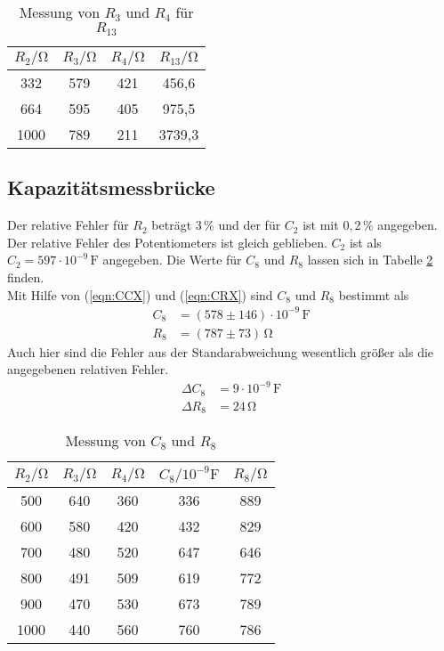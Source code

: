\begin{table}
  \centering
  \caption{Messung von $R_3$ und $R_4$ für $R_{13}$}
  \label{tab:R13}
  \begin{tabular}{c c c c}
    \toprule
    $R_2/\unit{\ohm}$ & $R_3/\unit{\ohm}$ & $R_4/\unit{\ohm}$ & $R_{13}/\unit{\ohm}$ \\
    \midrule
     332 & 579 & 421 &  456,6 \\
     664 & 595 & 405 &  975,5 \\
    1000 & 789 & 211 & 3739,3 \\
    \bottomrule
  \end{tabular}
\end{table}

\subsection{Kapazitätsmessbrücke}
Der relative Fehler für $R_2$ beträgt $3\,\%$ und der für $C_2$ ist mit $0,2 \,\%$ angegeben. Der relative Fehler des Potentiometers ist gleich geblieben.
$C_2$ ist als $C_2 = 597 \cdot 10^{-9}\,\unit{\farad}$ angegeben. Die Werte für $C_8$ und $R_8$ lassen sich in Tabelle \ref{tab:C8,R8} finden.\\
Mit Hilfe von (\ref{eqn:CCX}) und (\ref{eqn:CRX}) sind $C_8$ und $R_8$ bestimmt als
\begin{align*}
  C_8 &= (578 \pm 146)\cdot 10^{-9} \,\unit{\farad} \\
  R_8 &= (787 \pm 73)\,\unit{\ohm}
\end{align*}
Auch hier sind die Fehler aus der Standarabweichung wesentlich größer als die angegebenen relativen Fehler.
\begin{align*}
  \Delta C_{8} &= 9\cdot 10^{-9}\,\unit{\farad} \\
  \Delta R_{8} &= 24\,\unit{\ohm}
\end{align*}


\begin{table}
  \centering
  \caption{Messung von $C_8$ und $R_8$}
  \label{tab:C8,R8}
  \begin{tabular}{c c c c c}
    \toprule
    $R_2/\unit{\ohm}$ & $R_3/\unit{\ohm}$ & $R_4/\unit{\ohm}$ & $C_8/10^{-9}\unit{\farad}$ & $R_8/\unit{\ohm}$ \\
    \midrule
     500 & 640 & 360 & 336 & 889 \\
     600 & 580 & 420 & 432 & 829 \\
     700 & 480 & 520 & 647 & 646 \\
     800 & 491 & 509 & 619 & 772 \\
     900 & 470 & 530 & 673 & 789 \\
    1000 & 440 & 560 & 760 & 786 \\
    \bottomrule
  \end{tabular}
\end{table}

